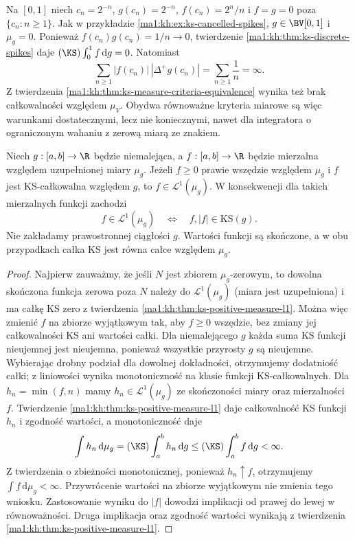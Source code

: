 \begin{przyklad}\label{ma1:kh:ex:ks-nonsummable-spikes}
Na $[0,1]$ niech $c_n=2^{-n}$, $g(c_n)=2^{-n}$, $f(c_n)=2^n/n$ i $f=g=0$ poza $\{c_n:n\ge1\}$. Jak w przykładzie \ref{ma1:kh:ex:ks-cancelled-spikes}, $g\in\BV[0,1]$ i $\mu_g=0$. Ponieważ $f(c_n)g(c_n)=1/n\to0$, twierdzenie \ref{ma1:kh:thm:ks-discrete-spikes} daje $(\KS)\int_0^1 f\,\mathrm dg=0$. Natomiast
\[
 \sum_{n\ge1}|f(c_n)|\,|\Delta^+g(c_n)|=\sum_{n\ge1}\frac1n=\infty.
\]
Z twierdzenia \ref{ma1:kh:thm:ks-measure-criteria-equivalence} wynika też brak całkowalności względem $\mu_V$. Obydwa równoważne kryteria miarowe są więc warunkami dostatecznymi, lecz nie koniecznymi, nawet dla integratora o ograniczonym wahaniu z zerową miarą ze znakiem.
\end{przyklad}
\begin{twierdzenie}\label{ma1:kh:thm:ks-absolute-monotone}
Niech $g:[a,b]\to\R$ będzie niemalejąca, a $f:[a,b]\to\R$ będzie mierzalna względem uzupełnionej miary $\mu_g$. Jeżeli $f\ge0$ prawie wszędzie względem $\mu_g$ i $f$ jest KS-całkowalna względem $g$, to $f\in\mathcal L^1(\mu_g)$. W konsekwencji dla takich mierzalnych funkcji zachodzi
\[
 f\in\mathcal L^1(\mu_g)\quad\Longleftrightarrow\quad
 f,|f|\in\mathrm{KS}(g).
\]
Nie zakładamy prawostronnej ciągłości $g$. Wartości funkcji są skończone, a w obu przypadkach całka KS jest równa całce względem $\mu_g$.
\end{twierdzenie}
\begin{proof}
Najpierw zauważmy, że jeśli $N$ jest zbiorem $\mu_g$-zerowym, to dowolna skończona funkcja zerowa poza $N$ należy do $\mathcal L^1(\mu_g)$ (miara jest uzupełniona) i ma całkę KS zero z twierdzenia \ref{ma1:kh:thm:ks-positive-measure-l1}. Można więc zmienić $f$ na zbiorze wyjątkowym tak, aby $f\ge0$ wszędzie, bez zmiany jej całkowalności KS ani wartości całki. Dla niemalejącego $g$ każda suma KS funkcji nieujemnej jest nieujemna, ponieważ wszystkie przyrosty $g$ są nieujemne. Wybierając drobny podział dla dowolnej dokładności, otrzymujemy dodatniość całki; z liniowości wynika monotoniczność na klasie funkcji KS-całkowalnych.
Dla $h_n=\min(f,n)$ mamy $h_n\in\mathcal L^1(\mu_g)$ ze skończoności miary oraz mierzalności $f$. Twierdzenie \ref{ma1:kh:thm:ks-positive-measure-l1} daje całkowalność KS funkcji $h_n$ i zgodność wartości, a monotoniczność daje
\[
 \int h_n\,\mathrm d\mu_g=(\KS)\int_a^b h_n\,\mathrm dg
 \le(\KS)\int_a^b f\,\mathrm dg<\infty.
\]
Z twierdzenia o zbieżności monotonicznej, ponieważ $h_n\uparrow f$, otrzymujemy $\int f\,\mathrm d\mu_g<\infty$. Przywrócenie wartości na zbiorze wyjątkowym nie zmienia tego wniosku. Zastosowanie wyniku do $|f|$ dowodzi implikacji od prawej do lewej w równoważności. Druga implikacja oraz zgodność wartości wynikają z twierdzenia \ref{ma1:kh:thm:ks-positive-measure-l1}.
\end{proof}

